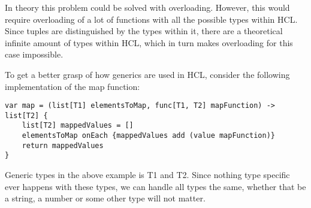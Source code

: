 In theory this problem could be solved with overloading. 
However, this would require overloading of a lot of functions with all the possible types within HCL. 
Since tuples are distinguished by the types within it, there are a theoretical infinite amount of types within HCL, which in turn makes overloading for this case impossible.

To get a better grasp of how generics are used in HCL, consider the following implementation of the map function:
\begin{lstlisting}
var map = (list[T1] elementsToMap, func[T1, T2] mapFunction) -> list[T2] {
	list[T2] mappedValues = []
	elementsToMap onEach {mappedValues add (value mapFunction)}
	return mappedValues
}
\end{lstlisting}

Generic types in the above example is T1 and T2. 
Since nothing type specific ever happens with these types, we can handle all types the same, whether that be a string, a number or some other type will not matter.